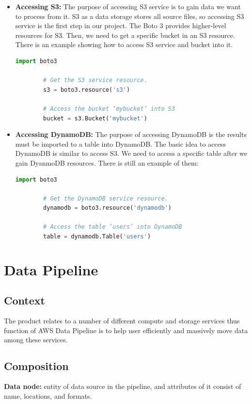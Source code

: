 	\begin{itemize}
	\item \textbf{Accessing S3:} 
	The purpose of accessing S3 service is to gain data we want to process from it. S3 as a data storage stores all source files, so accessing S3 service is the first step in our project. The Boto 3 provides higher-level resources for S3. Then, we need to get a specific bucket in an S3 resource. There is an example showing how to access S3 service and bucket into it.\\
	\begin{lstlisting}[language=Python, caption=Accessing S3 example\cite{z4}]
		import boto3
		
		# Get the S3 service resource.
		s3 = boto3.resource('s3')
		
		# Access the bucket ‘mybucket’ into S3
		bucket = s3.Bucket('mybucket')
	\end{lstlisting}	
	
	\item\textbf{Accessing DynamoDB:}
	The purpose of accessing DynamoDB is the results must be imported to a table into DynamoDB. The basic idea to access DynamoDB is similar to access S3. We need to access a specific table after we gain DyanmoDB resources. There is still an example of them:\\
	\begin{lstlisting}[language=Python, caption=Accessing DynamoDB\cite{z4}]
		import boto3
		
		# Get the DynamoDB service resource.
		dynamodb = boto3.resource('dynamodb')

		# Access the table ‘users’ into DynamoDB
		table = dynamodb.Table('users')
	\end{lstlisting}
	\end{itemize}
       
\section{Data Pipeline}
	\subsection{Context}
    The product relates to a number of different compute and storage services thus function of AWS Data Pipeline is to help user efficiently and massively move data among these services.
     
     \subsection{Composition}
     \textbf{Data node:} entity of data source in the pipeline, and attributes of it consist of name, locations, and formats\cite{z5}. 
     
